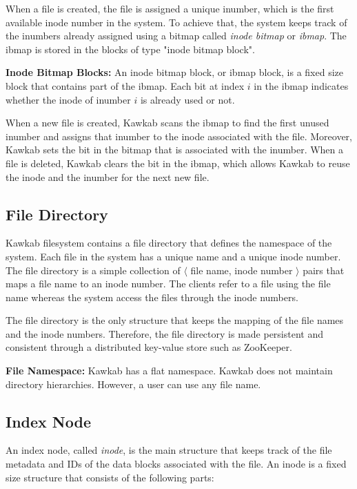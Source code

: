 \documentclass[]{article}
\newcommand{\subtopic}[1]{\vspace{1.5pt} \noindent \textbf{#1}}
\begin{document}
When a file is created, the file is assigned a unique inumber, which
is the first available inode number in the system. To achieve that, the
system keeps track of the inumbers already assigned using a bitmap
called \textit{inode bitmap} or \textit{ibmap}. The ibmap is stored in
the blocks of type "inode bitmap block".


\subtopic{Inode Bitmap Blocks:} An inode bitmap block, or ibmap block,
is a fixed size block that contains part of the ibmap. 
Each bit at index $i$ in the ibmap indicates whether the inode of inumber $i$ 
is already used or not. 

When a new file is created, Kawkab scans the ibmap to find the first unused 
inumber and assigns that inumber to the inode associated with the file. Moreover,
Kawkab sets the bit in the bitmap that is associated with the inumber.
When a file is deleted, Kawkab clears the bit in the ibmap, which allows
Kawkab to reuse the inode and the inumber for the next new file.


\subsection{File Directory} Kawkab filesystem contains a file directory that
defines the namespace of the system.
Each file in the system has a unique name and a unique inode number.  The file
directory is a simple collection of $\langle$ file name, inode number $\rangle$
pairs that maps a file name to an inode number.  The clients refer to a file
using the file name whereas the system access the files through the inode
numbers. 

The file directory is the only structure that keeps the mapping of the file
names and the inode numbers. Therefore, the file directory is made persistent
and consistent through a distributed key-value store such as ZooKeeper.

\subtopic{File Namespace:} Kawkab has a flat namespace. Kawkab does not maintain
directory hierarchies. However, a user can use any file name.



\subsection{Index Node} An index node, called \textit{inode}, is the main
structure that keeps track of the file metadata and IDs of the data
blocks associated with the file. An inode is a fixed size structure that
consists of the following parts:
\end{document}
